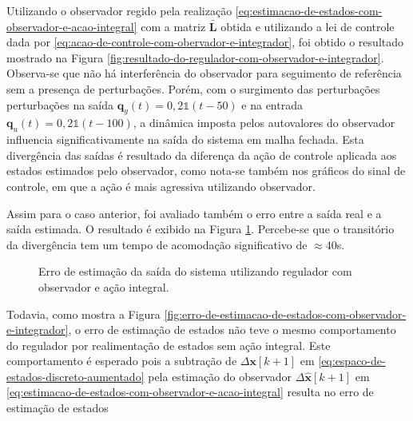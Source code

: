 Utilizando o observador regido pela realização
\ref{eq:estimacao-de-estados-com-observador-e-acao-integral} com a matriz
$\mathbf{\bar{L}}$ obtida e utilizando a lei de controle dada por
\ref{eq:acao-de-controle-com-obervador-e-integrador}, foi obtido o resultado
mostrado na Figura \ref{fig:resultado-do-regulador-com-observador-e-integrador}.
Observa-se que não há interferência do observador para seguimento de referência
sem a presença de perturbações. Porém, com o surgimento das perturbações
perturbações na saída $\mathbf{q}_{y}(t) = 0,2\mathbf{\mathds{1}}(t-50)$ e na
entrada $\mathbf{q}_{u}(t) = 0,2\mathbf{\mathds{1}}(t-100)$, a dinâmica imposta
pelos autovalores do observador influencia significativamente na saída do
sistema em malha fechada. Esta divergência das saídas é resultado da diferença
da ação de controle aplicada aos estados estimados pelo observador, como nota-se
também nos gráficos do sinal de controle, em que a ação é mais agressiva
utilizando observador.

Assim para o caso anterior, foi avaliado também o erro entre a saída real e a
saída estimada. O resultado é exibido na Figura
\ref{fig:erro-das-saidas-estimadas-utilizando-observador-e-integrador}.
Percebe-se que o transitório da divergência tem um tempo de acomodação
significativo de $\approx40$s.

\begin{figure}[!ht]
    \caption{Erro de estimação da saída do sistema utilizando regulador com
    observador e ação integral.}
    \vspace{-10pt}
    \hspace{-30pt}
    \label{fig:erro-das-saidas-estimadas-utilizando-observador-e-integrador}
    \begin{minipage}{\linewidth}
        
    \end{minipage}
\end{figure}

Todavia, como mostra a Figura
\ref{fig:erro-de-estimacao-de-estados-com-observador-e-integrador}, o erro de
estimação de estados não teve o mesmo comportamento do regulador por
realimentação de estados sem ação integral. Este comportamento é esperado pois
a subtração de $\Delta \mathbf{x}[k+1]$ em
\ref{eq:espaco-de-estados-discreto-aumentado} pela estimação do observador $\Delta
\mathbf{\hat{x}}[k+1]$ em
\ref{eq:estimacao-de-estados-com-observador-e-acao-integral} resulta no erro de
estimação de estados

